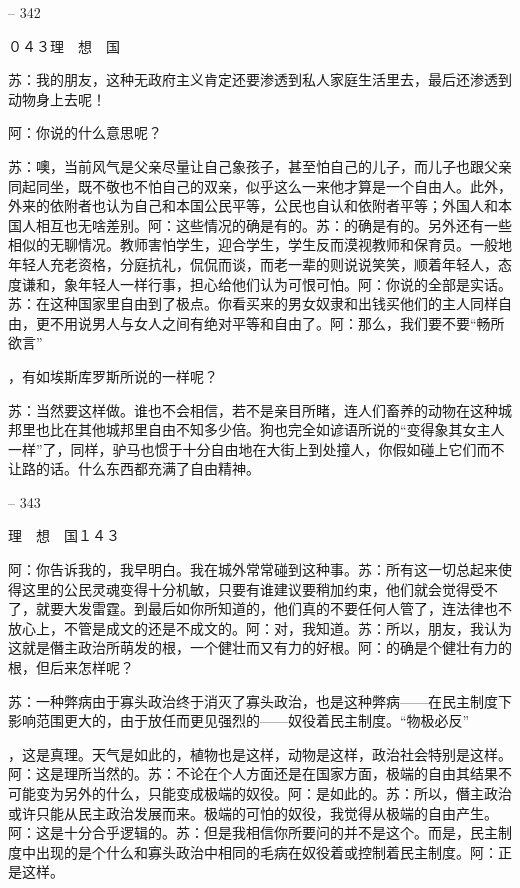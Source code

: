 \documentclass[11pt,oneside]{book}
\begin{document}
\begin{common-format}
    

-- 342

    ０４３理　想　国

    苏：我的朋友，这种无政府主义肯定还要渗透到私人家庭生活里去，最后还渗透到动物身上去呢！

    阿：你说的什么意思呢？

    苏：噢，当前风气是父亲尽量让自己象孩子，甚至怕自己的儿子，而儿子也跟父亲同起同坐，既不敬也不怕自己的双亲，似乎这么一来他才算是一个自由人。此外，外来的依附者也认为自己和本国公民平等，公民也自认和依附者平等；外国人和本国人相互也无啥差别。阿：这些情况的确是有的。苏：的确是有的。另外还有一些相似的无聊情况。教师害怕学生，迎合学生，学生反而漠视教师和保育员。一般地年轻人充老资格，分庭抗礼，侃侃而谈，而老一辈的则说说笑笑，顺着年轻人，态度谦和，象年轻人一样行事，担心给他们认为可恨可怕。阿：你说的全部是实话。苏：在这种国家里自由到了极点。你看买来的男女奴隶和出钱买他们的主人同样自由，更不用说男人与女人之间有绝对平等和自由了。阿：那么，我们要不要“畅所欲言”

    ，有如埃斯库罗斯所说的一样呢？

    苏：当然要这样做。谁也不会相信，若不是亲目所睹，连人们畜养的动物在这种城邦里也比在其他城邦里自由不知多少倍。狗也完全如谚语所说的“变得象其女主人一样”了，同样，驴马也惯于十分自由地在大街上到处撞人，你假如碰上它们而不让路的话。什么东西都充满了自由精神。

    

-- 343

    理　想　国１４３

    阿：你告诉我的，我早明白。我在城外常常碰到这种事。苏：所有这一切总起来使得这里的公民灵魂变得十分机敏，只要有谁建议要稍加约束，他们就会觉得受不了，就要大发雷霆。到最后如你所知道的，他们真的不要任何人管了，连法律也不放心上，不管是成文的还是不成文的。阿：对，我知道。苏：所以，朋友，我认为这就是僭主政治所萌发的根，一个健壮而又有力的好根。阿：的确是个健壮有力的根，但后来怎样呢？

    苏：一种弊病由于寡头政治终于消灭了寡头政治，也是这种弊病——在民主制度下影响范围更大的，由于放任而更见强烈的——奴役着民主制度。“物极必反”

    ，这是真理。天气是如此的，植物也是这样，动物是这样，政治社会特别是这样。阿：这是理所当然的。苏：不论在个人方面还是在国家方面，极端的自由其结果不可能变为另外的什么，只能变成极端的奴役。阿：是如此的。苏：所以，僭主政治或许只能从民主政治发展而来。极端的可怕的奴役，我觉得从极端的自由产生。阿：这是十分合乎逻辑的。苏：但是我相信你所要问的并不是这个。而是，民主制度中出现的是个什么和寡头政治中相同的毛病在奴役着或控制着民主制度。阿：正是这样。


\end{common-format}
\end{document}
